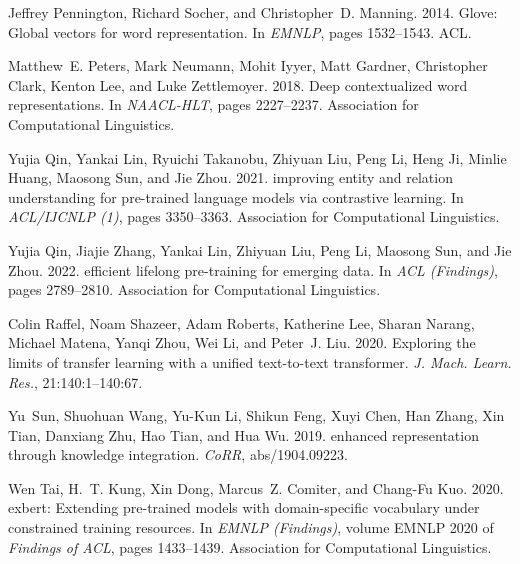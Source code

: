 \documentclass[11pt]{article}
\begin{document}
\begin{thebibliography}{59}
Jeffrey Pennington, Richard Socher, and Christopher~D. Manning. 2014.
\newblock Glove: Global vectors for word representation.
\newblock In \emph{{EMNLP}}, pages 1532--1543. {ACL}.

Matthew~E. Peters, Mark Neumann, Mohit Iyyer, Matt Gardner, Christopher Clark,
  Kenton Lee, and Luke Zettlemoyer. 2018.
\newblock Deep contextualized word representations.
\newblock In \emph{{NAACL-HLT}}, pages 2227--2237. Association for
  Computational Linguistics.

Yujia Qin, Yankai Lin, Ryuichi Takanobu, Zhiyuan Liu, Peng Li, Heng Ji, Minlie
  Huang, Maosong Sun, and Jie Zhou. 2021.
 improving entity and relation understanding for pre-trained
  language models via contrastive learning.
\newblock In \emph{{ACL/IJCNLP} {(1)}}, pages 3350--3363. Association for
  Computational Linguistics.

Yujia Qin, Jiajie Zhang, Yankai Lin, Zhiyuan Liu, Peng Li, Maosong Sun, and Jie
  Zhou. 2022.
 efficient lifelong pre-training for emerging data.
\newblock In \emph{{ACL} (Findings)}, pages 2789--2810. Association for
  Computational Linguistics.

Colin Raffel, Noam Shazeer, Adam Roberts, Katherine Lee, Sharan Narang, Michael
  Matena, Yanqi Zhou, Wei Li, and Peter~J. Liu. 2020.
\newblock Exploring the limits of transfer learning with a unified text-to-text
  transformer.
\newblock \emph{J. Mach. Learn. Res.}, 21:140:1--140:67.

Yu~Sun, Shuohuan Wang, Yu{-}Kun Li, Shikun Feng, Xuyi Chen, Han Zhang, Xin
  Tian, Danxiang Zhu, Hao Tian, and Hua Wu. 2019.
 enhanced representation through knowledge integration.
\newblock \emph{CoRR}, abs/1904.09223.

Wen Tai, H.~T. Kung, Xin Dong, Marcus~Z. Comiter, and Chang{-}Fu Kuo. 2020.
\newblock exbert: Extending pre-trained models with domain-specific vocabulary
  under constrained training resources.
\newblock In \emph{{EMNLP} (Findings)}, volume {EMNLP} 2020 of \emph{Findings
  of {ACL}}, pages 1433--1439. Association for Computational Linguistics.


\end{thebibliography}
\end{document}
